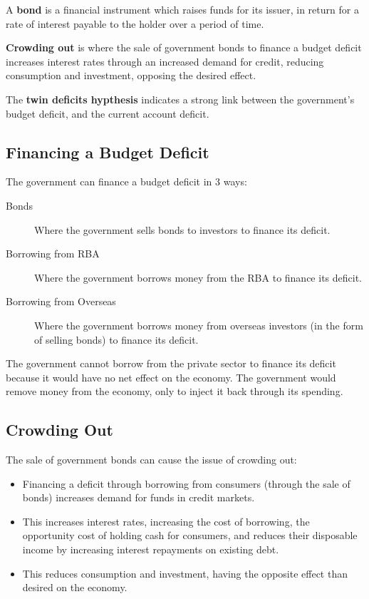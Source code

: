 \documentclass[a4paper,11pt]{article}
\begin{document}
A \textbf{bond} is a financial instrument which raises funds for its issuer, in
return for a rate of interest payable to the holder over a period of time.

\textbf{Crowding out} is where the sale of government bonds to finance a budget
deficit increases interest rates through an increased demand for credit,
reducing consumption and investment, opposing the desired effect.

The \textbf{twin deficits hypthesis} indicates a strong link between the
government's budget deficit, and the current account deficit.


\subsection{Financing a Budget Deficit}

The government can finance a budget deficit in 3 ways:

\begin{description}
\item [Bonds] Where the government sells bonds to investors to finance its
	deficit.
\item [Borrowing from RBA] Where the government borrows money from the RBA to
	finance its deficit.
\item [Borrowing from Overseas] Where the government borrows money from overseas
	investors (in the form of selling bonds) to finance its deficit.
\end{description}

The government cannot borrow from the private sector to finance its deficit
because it would have no net effect on the economy. The government would remove
money from the economy, only to inject it back through its spending.


\subsection{Crowding Out}

The sale of government bonds can cause the issue of crowding out:

\begin{itemize}
\item Financing a deficit through borrowing from consumers (through the sale of
	bonds) increases demand for funds in credit markets.
\item This increases interest rates, increasing the cost of borrowing, the
	opportunity cost of holding cash for consumers, and reduces their disposable
	income by increasing interest repayments on existing debt.
\item This reduces consumption and investment, having the opposite effect than
	desired on the economy.
\end{itemize}
\end{document}
